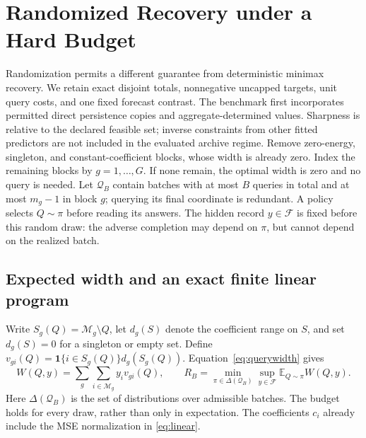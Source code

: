 \documentclass[12pt]{article}
\newcommand{\F}{\mathcal{F}}
\newcommand{\M}{\mathcal{M}}
\begin{document}
\section{Randomized Recovery under a Hard Budget}
\label{sec:randomized-recovery}

Randomization permits a different guarantee from deterministic minimax
recovery. We retain exact disjoint totals, nonnegative uncapped targets,
unit query costs, and one fixed forecast contrast. The benchmark first incorporates permitted direct persistence copies
and aggregate-determined values. Sharpness is relative to the declared
feasible set; inverse constraints from other fitted predictors are not
included in the evaluated archive regime.
Remove zero-energy, singleton, and constant-coefficient blocks, whose width
is already zero. Index the remaining blocks by $g=1,\ldots,G$.
If none remain, the optimal width is zero and no query is needed.
Let $\mathcal Q_B$ contain batches with at most $B$ queries in total and
at most $m_g-1$ in block $g$; querying its final coordinate is redundant.
A policy selects $Q\sim\pi$ before reading its answers. The hidden record
$y\in\F$ is fixed before this random draw: the adverse completion may
depend on $\pi$, but cannot depend on the realized batch.

\subsection{Expected width and an exact finite linear program}
Write $S_g(Q)=\M_g\setminus Q$, let $d_g(S)$ denote the coefficient range
on $S$, and set $d_g(S)=0$ for a singleton or empty set. Define
$v_{gi}(Q)=\boldsymbol{1}\{i\in S_g(Q)\}d_g(S_g(Q))$.
Equation~\eqref{eq:querywidth} gives
\begin{equation}
 W(Q,y)=\sum_g\sum_{i\in\M_g}y_i v_{gi}(Q),\qquad
 R_B=\min_{\pi\in\Delta(\mathcal Q_B)}\sup_{y\in\F}
       \mathbb E_{Q\sim\pi}W(Q,y).
 \label{eq:random-objective}
\end{equation}
Here $\Delta(\mathcal Q_B)$ is the set of distributions over admissible
batches. The budget holds for every draw, rather than only in expectation.
The coefficients $c_i$ already include the MSE normalization in
\eqref{eq:linear}.
\end{document}
